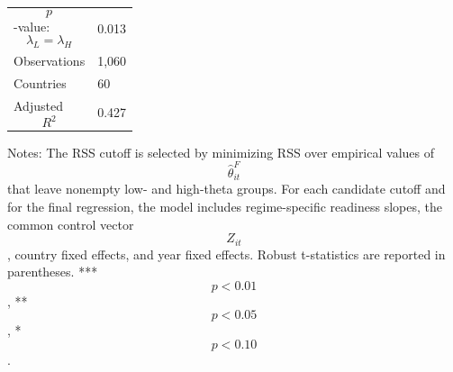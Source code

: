 \begin{table}[H]
\begin{threeparttable}
\begin{tabularx}{\textwidth}{lY}
$$p$$-value: $$\lambda_L=\lambda_H$$ & 0.013 \\
Observations & 1,060 \\
Countries & 60 \\
Adjusted $$R^2$$ & 0.427 \\
\bottomrule
\end{tabularx}
\begin{tablenotes}[flushleft]\footnotesize
\item Notes: The RSS cutoff is selected by minimizing RSS over empirical values of $$\widehat{\theta}^{F}_{it}$$ that leave nonempty low- and high-theta groups. For each candidate cutoff and for the final regression, the model includes regime-specific readiness slopes, the common control vector $$Z_{it}$$, country fixed effects, and year fixed effects. Robust t-statistics are reported in parentheses. *** $$p<0.01$$, ** $$p<0.05$$, * $$p<0.10$$.
\end{tablenotes}
\end{threeparttable}
\end{table}
